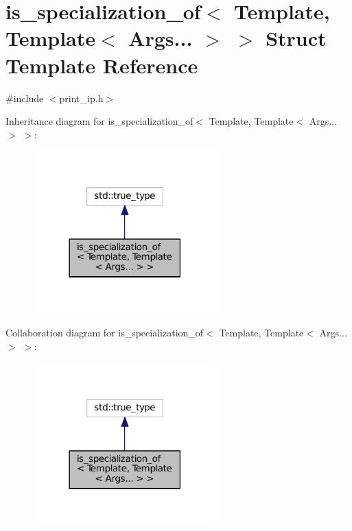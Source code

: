 \hypertarget{structis__specialization__of_3_01_template_00_01_template_3_01_args_8_8_8_01_4_01_4}{}\section{is\+\_\+specialization\+\_\+of$<$ Template, Template$<$ Args... $>$ $>$ Struct Template Reference}
\label{structis__specialization__of_3_01_template_00_01_template_3_01_args_8_8_8_01_4_01_4}


{\ttfamily \#include $<$print\+\_\+ip.\+h$>$}



Inheritance diagram for is\+\_\+specialization\+\_\+of$<$ Template, Template$<$ Args... $>$ $>$\+:
\nopagebreak
\begin{figure}[H]
\begin{center}
\leavevmode
\includegraphics[width=201pt]{structis__specialization__of_3_01_template_00_01_template_3_01_args_8_8_8_01_4_01_4__inherit__graph}
\end{center}
\end{figure}


Collaboration diagram for is\+\_\+specialization\+\_\+of$<$ Template, Template$<$ Args... $>$ $>$\+:
\nopagebreak
\begin{figure}[H]
\begin{center}
\leavevmode
\includegraphics[width=201pt]{structis__specialization__of_3_01_template_00_01_template_3_01_args_8_8_8_01_4_01_4__coll__graph}
\end{center}
\end{figure}


